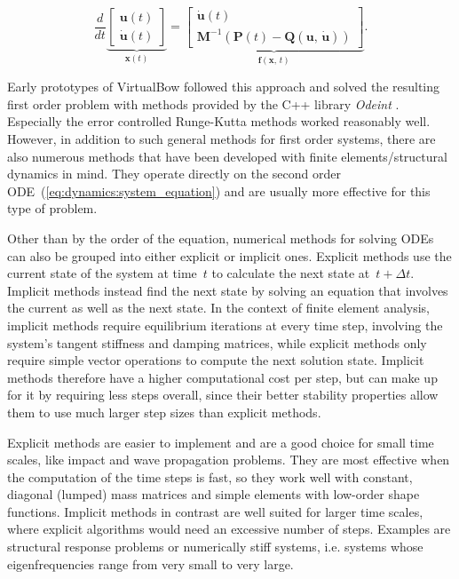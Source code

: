 \begin{equation}
\frac{d}{dt}
\underbrace{
\begin{bmatrix}
\boldsymbol{u}(t) \\
\dot{\boldsymbol{u}}(t)
\end{bmatrix}
}_{\boldsymbol{x}(t)}
=
\underbrace{
\begin{bmatrix}
\dot{\boldsymbol{u}}(t) \\
\boldsymbol{M}^{-1}\left(\boldsymbol{P}(t) - \boldsymbol{Q}(\boldsymbol{u},\,\dot{\boldsymbol{u}})\right)
\end{bmatrix}
}_{\boldsymbol{f}(\boldsymbol{x},\,t)}.
\end{equation}

Early prototypes of VirtualBow followed this approach and solved the resulting first order problem with methods provided by the C++ library \textit{Odeint} \cite{bib:ahnert2011}.
Especially the error controlled Runge-Kutta methods worked reasonably well.
However, in addition to such general methods for first order systems, there are also numerous methods that have been developed with finite elements/structural dynamics in mind.
They operate directly on the second order ODE~(\ref{eq:dynamics:system_equation}) and are usually more effective for this type of problem.

Other than by the order of the equation, numerical methods for solving ODEs can also be grouped into either explicit or implicit ones.
Explicit methods use the current state of the system at time~$t$ to calculate the next state at~$t + \Delta t$.
Implicit methods instead find the next state by solving an equation that involves the current as well as the next state.
In the context of finite element analysis, implicit methods require equilibrium iterations at every time step, involving the system's tangent stiffness and damping matrices, while explicit methods only require simple vector operations to compute the next solution state.
Implicit methods therefore have a higher computational cost per step, but can make up for it by requiring less steps overall, since their better stability properties allow them to use much larger step sizes than explicit methods.

Explicit methods are easier to implement and are a good choice for small time scales, like impact and wave propagation problems.
They are most effective when the computation of the time steps is fast, so they work well with constant, diagonal (lumped) mass matrices and simple elements with low-order shape functions.
Implicit methods in contrast are well suited for larger time scales, where explicit algorithms would need an excessive number of steps.
Examples are structural response problems or numerically stiff systems, i.e. systems whose eigenfrequencies range from very small to very large.

